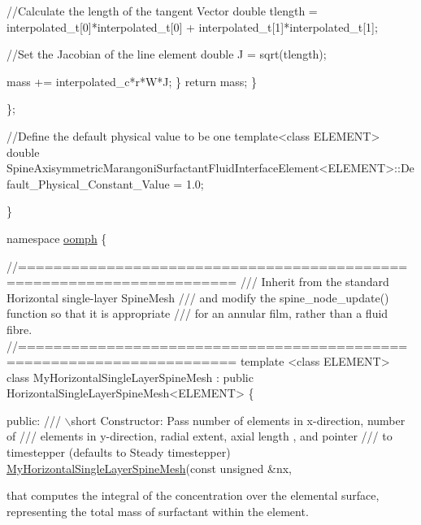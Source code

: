 \begin{DoxyCodeInclude}
   \textcolor{comment}{//Calculate the length of the tangent Vector}
   \textcolor{keywordtype}{double} tlength = interpolated\_t[0]*interpolated\_t[0] + 
    interpolated\_t[1]*interpolated\_t[1];
   
   \textcolor{comment}{//Set the Jacobian of the line element}
   \textcolor{keywordtype}{double} J = sqrt(tlength);

   mass += interpolated\_c*r*W*J;
    \}
   \textcolor{keywordflow}{return} mass;
  \}

\};


\textcolor{comment}{//Define the default physical value to be one}
\textcolor{keyword}{template}<\textcolor{keyword}{class} ELEMENT>
\textcolor{keywordtype}{double} SpineAxisymmetricMarangoniSurfactantFluidInterfaceElement<ELEMENT>::Default\_Physical\_Constant\_Value 
      = 1.0;

\}


\textcolor{keyword}{namespace }\hyperlink{namespaceoomph}{oomph}
\{

\textcolor{comment}{//======================================================================}\textcolor{comment}{}
\textcolor{comment}{/// Inherit from the standard Horizontal single-layer SpineMesh}
\textcolor{comment}{/// and modify the spine\_node\_update() function so that it is appropriate}
\textcolor{comment}{/// for an annular film, rather than a fluid fibre.}
\textcolor{comment}{}\textcolor{comment}{//======================================================================}
\textcolor{keyword}{template} <\textcolor{keyword}{class} ELEMENT>
\textcolor{keyword}{class }MyHorizontalSingleLayerSpineMesh : 
  \textcolor{keyword}{public} HorizontalSingleLayerSpineMesh<ELEMENT>
\{

\textcolor{keyword}{public}:
\textcolor{comment}{}
\textcolor{comment}{ /// \(\backslash\)short Constructor: Pass number of elements in x-direction, number of}
\textcolor{comment}{ /// elements in y-direction, radial extent, axial length , and pointer }
\textcolor{comment}{ /// to timestepper (defaults to Steady timestepper)}
\textcolor{comment}{} \hyperlink{classoomph_1_1MyHorizontalSingleLayerSpineMesh_a0bd73ed947e30341144d081df52332b5}{MyHorizontalSingleLayerSpineMesh}(\textcolor{keyword}{const} \textcolor{keywordtype}{unsigned} &nx, 

\end{DoxyCodeInclude}
 that computes the integral of the concentration over the elemental surface, representing the total mass of surfactant within the element.



